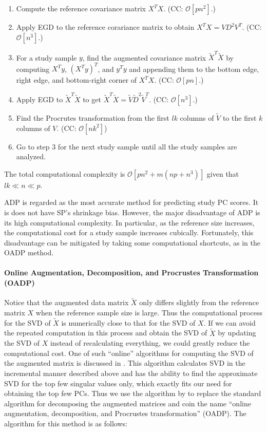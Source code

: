 \documentclass{article}
\newcommand{\bO}{\mathcal{O}}
\begin{document}
\begin{enumerate}
\item Compute the reference covariance matrix $X^T X$.
  (CC: $\bO[pn^2]$.)  
\item Apply EGD to the reference corariance matrix
  to obtain $X^T X = V D^2 V^T$.
  (CC: $\bO[n^3]$.)
\item For a study sample $y$,
  find the augmented covariance matrix
  $\tilde{X}^T \tilde{X}$
  by computing $X^T y$, $(X^T y)^T$, and $y^T y$
  and appending them to the
  bottom edge,
  right edge,
  and bottom-right corner of $X^TX$.
  (CC: $\bO[pn]$.)
\item Apply EGD to $\tilde{X}^T \tilde{X}$ to get $\tilde{X}^T \tilde{X} = \tilde{V} \tilde{D}^2 \tilde{V}^T$.
  (CC: $\bO[n^3]$.)
\item Find the Procrutes transformation
from the first $lk$ columns of $\tilde{V}$
to the first $k$ columns of $V$.
  (CC: $\bO[nk^2]$)
  \item Go to step 3 for the next study sample
  until all the study samples are analyzed.
\end{enumerate}
The total computational complexity is
$\bO[pn^2 + m(np + n^3)]$
given that $lk \ll n \ll p$.

ADP is regarded as the most accurate method for predicting study PC scores.
It is does not have SP's shrinkage bias.
However, the major disadvantage of ADP
is its high computational complexity.
In particular,
as the reference size increases,
the computational cost for a study sample
increases cubically.
Fortunately, this disadvantage can be mitigated by taking some computational shortcuts,
as in the OADP method.

\paragraph{Online Augmentation, Decomposition, and Procrustes Transformation (OADP)}

Notice that the augmented data matrix $\tilde{X}$
only differs slightly from the reference matrix $X$
when the reference sample size is large.
Thus the computational process for the SVD of $\tilde{X}$
is numerically close to that for the SVD of $X$.
If we can avoid the repeated computation in this process
and obtain the SVD of $\tilde{X}$
by updating the SVD of $X$
instead of recalculating everything,
we could greatly reduce the computational cost.
One of such ``online'' algorithms for computing the SVD of the augmented matrix is discussed in \citet{brand2002incremental}.
This algorithm calculates SVD in the incremental manner described above
and has the ability to find the approximate SVD for the top few singular values only,
which exactly fits our need for obtaining the top few PCs.
Thus we use the algorithm by \citet{brand2002incremental}
to replace the standard algorithm for decomposing the augmented matrices
and coin the name ``online augmentation, decomposition, and Procrustes transformation'' (OADP).
The algorithm for this method is as follows:
\end{document}
